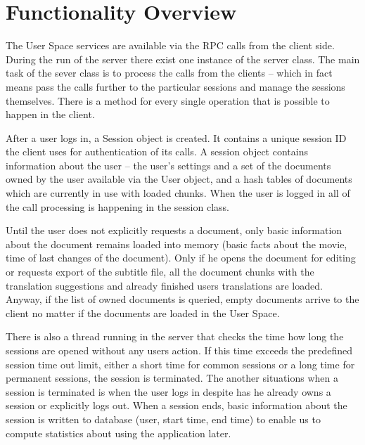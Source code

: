 \section{Functionality Overview}

The User Space services are available via the RPC calls from the client side. During the run of the server there exist one instance of the server class. The main task of the sever class is to process the calls from the clients -- which in fact means pass the calls further to the particular sessions and manage the sessions themselves. There is a method for every single operation that is possible to happen in the client.

After a user logs in, a Session object is created. It contains a unique session ID the client uses for authentication of its calls. A session object contains information about the user -- the user's settings and a set of the documents owned by the user available via the User object, and a hash tables of documents which are currently in use with loaded chunks. When the user is logged in all of the call processing is happening in the session class.

Until the user does not explicitly requests a document, only basic information about the document remains loaded into memory (basic facts about the movie, time of last changes of the document). Only if he opens the document for editing or requests export of the subtitle file, all the document chunks with the translation suggestions and already finished users translations are loaded. Anyway, if the list of owned documents is queried, empty documents arrive to the client no matter if the documents are loaded in the User Space.

There is also a thread running in the server that checks the time how long the sessions are opened without any users action. If this time exceeds the predefined session time out limit, either a short time for common sessions or a long time for permanent sessions, the session is terminated. The another situations when a session is terminated is when the user logs in despite has he already owns a session or explicitly logs out. When a session ends, basic information about the session is written to database (user, start time, end time) to enable us to compute statistics about using the application later.

